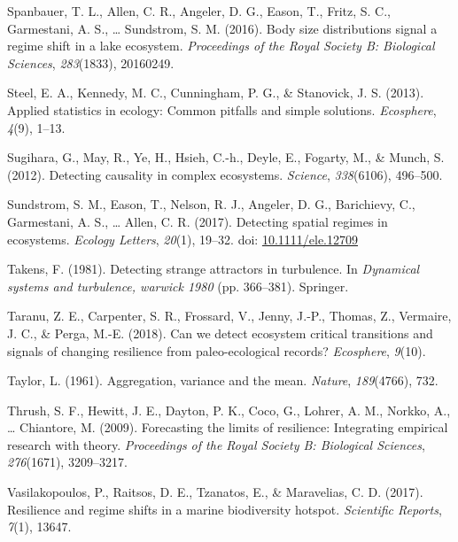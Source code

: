 \documentclass[12pt,twoside,openany]{reedthesis}
\begin{document}
\leavevmode\hypertarget{ref-spanbauer2016body}{}%
Spanbauer, T. L., Allen, C. R., Angeler, D. G., Eason, T., Fritz, S. C., Garmestani, A. S., \ldots{} Sundstrom, S. M. (2016). Body size distributions signal a regime shift in a lake ecosystem. \emph{Proceedings of the Royal Society B: Biological Sciences}, \emph{283}(1833), 20160249.

\leavevmode\hypertarget{ref-steel2013applied}{}%
Steel, E. A., Kennedy, M. C., Cunningham, P. G., \& Stanovick, J. S. (2013). Applied statistics in ecology: Common pitfalls and simple solutions. \emph{Ecosphere}, \emph{4}(9), 1--13.

\leavevmode\hypertarget{ref-sugihara2012detecting}{}%
Sugihara, G., May, R., Ye, H., Hsieh, C.-h., Deyle, E., Fogarty, M., \& Munch, S. (2012). Detecting causality in complex ecosystems. \emph{Science}, \emph{338}(6106), 496--500.

\leavevmode\hypertarget{ref-sundstrom2017detecting}{}%
Sundstrom, S. M., Eason, T., Nelson, R. J., Angeler, D. G., Barichievy, C., Garmestani, A. S., \ldots{} Allen, C. R. (2017). Detecting spatial regimes in ecosystems. \emph{Ecology Letters}, \emph{20}(1), 19--32. doi: \href{https://doi.org/10.1111/ele.12709}{10.1111/ele.12709}

\leavevmode\hypertarget{ref-takens1981detecting}{}%
Takens, F. (1981). Detecting strange attractors in turbulence. In \emph{Dynamical systems and turbulence, warwick 1980} (pp. 366--381). Springer.

\leavevmode\hypertarget{ref-taranu2018can}{}%
Taranu, Z. E., Carpenter, S. R., Frossard, V., Jenny, J.-P., Thomas, Z., Vermaire, J. C., \& Perga, M.-E. (2018). Can we detect ecosystem critical transitions and signals of changing resilience from paleo-ecological records? \emph{Ecosphere}, \emph{9}(10).

\leavevmode\hypertarget{ref-taylor1961aggregation}{}%
Taylor, L. (1961). Aggregation, variance and the mean. \emph{Nature}, \emph{189}(4766), 732.

\leavevmode\hypertarget{ref-thrush2009forecasting}{}%
Thrush, S. F., Hewitt, J. E., Dayton, P. K., Coco, G., Lohrer, A. M., Norkko, A., \ldots{} Chiantore, M. (2009). Forecasting the limits of resilience: Integrating empirical research with theory. \emph{Proceedings of the Royal Society B: Biological Sciences}, \emph{276}(1671), 3209--3217.

\leavevmode\hypertarget{ref-vasilakopoulos2017resilience}{}%
Vasilakopoulos, P., Raitsos, D. E., Tzanatos, E., \& Maravelias, C. D. (2017). Resilience and regime shifts in a marine biodiversity hotspot. \emph{Scientific Reports}, \emph{7}(1), 13647.
\end{document}
